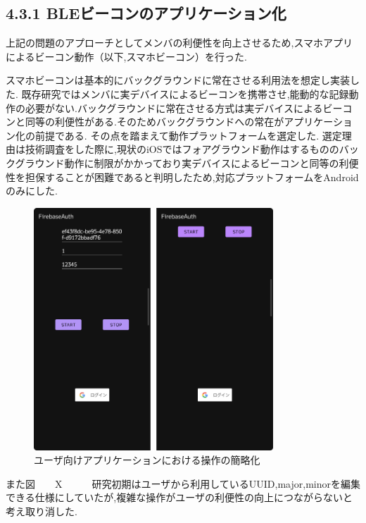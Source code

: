\subsection*{4.3.1 BLEビーコンのアプリケーション化}
上記の問題のアプローチとしてメンバの利便性を向上させるため,スマホアプリによるビーコン動作（以下,スマホビーコン）を行った.

スマホビーコンは基本的にバックグラウンドに常在させる利用法を想定し実装した.
既存研究ではメンバに実デバイスによるビーコンを携帯させ,能動的な記録動作の必要がない.バックグラウンドに常在させる方式は実デバイスによるビーコンと同等の利便性がある.そのためバックグラウンドへの常在がアプリケーション化の前提である.
その点を踏まえて動作プラットフォームを選定した.
選定理由は技術調査をした際に,現状のiOSではフォアグラウンド動作はするもののバックグラウンド動作に制限がかかっており実デバイスによるビーコンと同等の利便性を担保することが困難であると判明したため,対応プラットフォームをAndroidのみにした.



 \begin{figure}[tbh]
   \centering
   \includegraphics[width=9cm]{image/AppBeforeAfter.png}
   \caption{ユーザ向けアプリケーションにおける操作の簡略化}
   \label{multipleBPM}
 \end{figure}
また図　　X　　　研究初期はユーザから利用しているUUID,major,minorを編集できる仕様にしていたが,複雑な操作がユーザの利便性の向上につながらないと考え取り消した.




